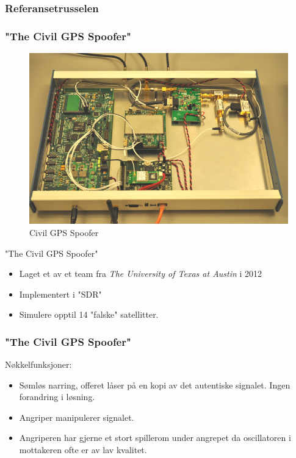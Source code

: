 \documentclass[xcolor=table]{beamer}
\begin{document}
\subsubsection{Referansetrusselen}
\begin{frame}
  \frametitle{"The Civil GPS Spoofer"}
  \begin{figure}
    \includegraphics[scale=0.2]{pics/texas_spoofer.jpg}
    \caption{Civil GPS Spoofer}
  \end{figure}
  "The Civil GPS Spoofer"
  \begin{itemize}
    \item Laget et av et team fra \textit{The University of Texas at Austin} i 2012 \cite{EVPMUGA}
    \item Implementert i "SDR"
    \item Simulere opptil 14 "falske" satellitter.
  \end{itemize}
\end{frame}

\begin{frame}
  \frametitle{"The Civil GPS Spoofer"}
  Nøkkelfunksjoner:
  \begin{itemize}
    \item Sømløs narring, offeret låser på en kopi av det autentiske signalet. Ingen forandring i løsning.
    \item Angriper manipulerer signalet.
    \item Angriperen har gjerne et stort spillerom under angrepet da oscillatoren i mottakeren ofte er av lav kvalitet.
  \end{itemize}
\end{frame}
\end{document}
